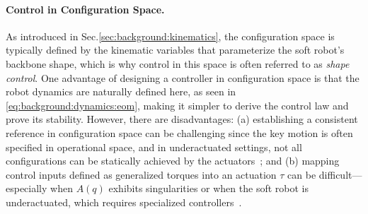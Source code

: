 \paragraph{Control in Configuration Space.}
As introduced in Sec.\ref{sec:background:kinematics}, the configuration space is typically defined by the kinematic variables that parameterize the soft robot’s backbone shape, which is why control in this space is often referred to as \emph{shape control}. One advantage of designing a controller in configuration space is that the robot dynamics are naturally defined here, as seen in \eqref{eq:background:dynamics:eom}, making it simpler to derive the control law and prove its stability. However, there are disadvantages: (a) establishing a consistent reference in configuration space can be challenging since the key motion is often specified in operational space, and in underactuated settings, not all configurations can be statically achieved by the actuators~\citep{della2025pushing}; and (b) mapping control inputs defined as generalized torques into an actuation $\tau$ can be difficult—especially when $A(q)$ exhibits singularities or when the soft robot is underactuated, which requires specialized controllers~\citep{pustina2022feedback}.


